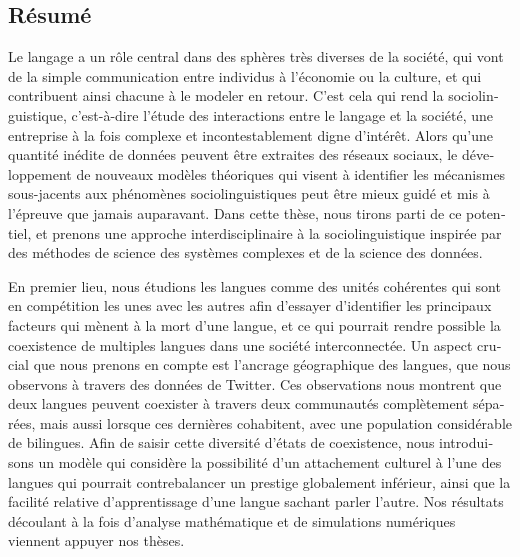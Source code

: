 \documentclass[../thesis.tex]{subfiles}
\begin{document}
\begin{otherlanguage}{french}
\chapter*{Résumé}
Le langage a un rôle central dans des sphères très diverses de la société, qui vont de la simple communication entre individus à l'économie ou la culture, et qui contribuent ainsi chacune à le modeler en retour.
C'est cela qui rend la sociolinguistique, c'est-à-dire l'étude des
interactions entre le langage et la société, une entreprise à la fois complexe et
incontestablement digne d'intérêt. Alors qu'une quantité inédite de données peuvent être
extraites des réseaux sociaux, le développement de nouveaux modèles théoriques qui
visent à identifier les mécanismes sous-jacents aux phénomènes sociolinguistiques peut
être mieux guidé et mis à l'épreuve que jamais auparavant. Dans cette thèse, nous tirons
parti de ce potentiel, et prenons une approche interdisciplinaire à la sociolinguistique
inspirée par des méthodes de science des systèmes complexes et de la science des
données.

En premier lieu, nous étudions les langues comme des unités cohérentes qui sont en
compétition les unes avec les autres afin d'essayer d'identifier les principaux facteurs
qui mènent à la mort d'une langue, et ce qui pourrait rendre possible la coexistence de
multiples langues dans une société interconnectée. Un aspect crucial que nous prenons en
compte est l'ancrage géographique des langues, que nous observons à travers des données
de Twitter. Ces observations nous montrent que deux langues peuvent coexister à travers
deux communautés complètement séparées, mais aussi lorsque ces dernières cohabitent,
avec une population considérable de bilingues. Afin de saisir cette diversité d'états de
coexistence, nous introduisons un modèle qui considère la possibilité d'un attachement
culturel à l'une des langues qui pourrait contrebalancer un prestige globalement
inférieur, ainsi que la facilité relative d'apprentissage d'une langue sachant parler
l'autre. Nos résultats découlant à la fois d'analyse mathématique et de simulations
numériques viennent appuyer nos thèses.


\end{otherlanguage}
\end{document}

